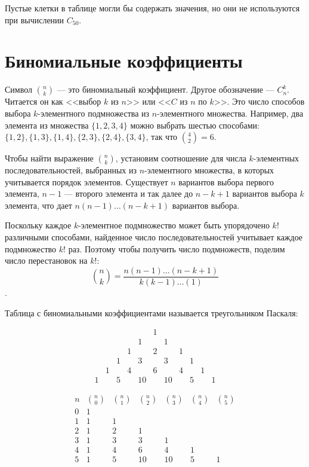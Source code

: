 \documentclass[14pt]{book}
\begin{document}
Пустые клетки в таблице могли бы содержать значения, но они не используются при вычислении
$C_{50}$.

\section{Биномиальные коэффициенты}

Символ $\binom{n}{k}$ --- это биномиальный коэффициент. Другое обозначение --- $C_n^k$.
Читается он как <<выбор $k$ из $n$>> или <<$C$ из $n$ по $k$>>. Это число способов выбора
$k$-элементного подмножества из $n$-элементного множества. Например, два элемента
из множества $\{1,2,3,4\}$ можно выбрать шестью способами: 
$\{1,2\}, \{1,3\}, \{1,4\}, \{2,3\}, \{2,4\}, \{3,4\}$, так что $\binom{4}{2}=6$.

Чтобы найти выражение $\binom{n}{k}$, установим соотношение для числа $k$-элементных
последовательностей, выбранных из $n$-элементного множества, в которых учитывается порядок
элементов. Существует $n$ вариантов выбора первого элемента, $n-1$ --- второго элемента
и так далее до $n-k+1$ вариантов выбора $k$ элемента, что дает $n(n-1)\ldots(n-k+1)$
вариантов выбора.

Поскольку каждое $k$-элементное подмножество может быть упорядочено $k!$ различными способами,
найденное число последовательностей учитывает каждое подмножество $k!$ раз. Поэтому чтобы
получить число подмножеств, поделим число перестановок на $k!$:
$$\binom{n}{k} = \frac{n(n-1)\ldots(n-k+1)}{k(k-1)\ldots(1)}$$.

Таблица с биномиальными коэффициентами называется треугольником Паскаля:

$$
 \begin{array}{ccccccccccc}
 &&&&& 1 \\
 &&&& 1 && 1 \\
 &&& 1 && 2 && 1 \\
 && 1 && 3 && 3 && 1 \\
 & 1 && 4 && 6 && 4 && 1 \\
 1 && 5 && 10 && 10 && 5 && 1
 \end{array}
$$

$$
 \begin{array}{ccccccc}
 n & \binom{n}{0} & \binom{n}{1} & \binom{n}{2} & \binom{n}{3} & \binom{n}{4} & \binom{n}{5} \\
 0 & 1 \\
 1 & 1 & 1 \\
 2 &  1 & 2 & 1 \\
 3 & 1 & 3 & 3 & 1 \\
 4 & 1 & 4 & 6 & 4 & 1 \\
 5 & 1 & 5 & 10 & 10 & 5 & 1
 \end{array}
$$
\end{document}
